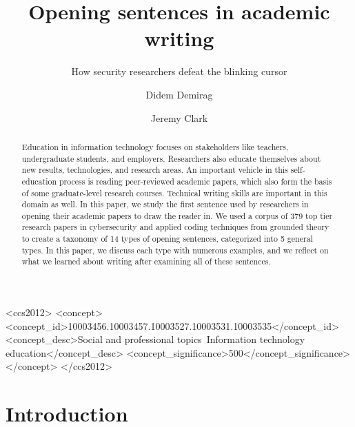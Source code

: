 \documentclass[sigconf,anonymous]{acmart}
\begin{document}
	
\title{Opening sentences in academic writing}
\subtitle{How security researchers defeat the blinking cursor}

\author{Didem Demirag}
\author{Jeremy Clark}
	
\begin{abstract}

Education in information technology focuses on stakeholders like teachers, undergraduate students, and employers. Researchers also educate themselves about new results, technologies, and research areas. An important vehicle in this self-education process is reading peer-reviewed academic papers, which also form the basis of some graduate-level research courses. Technical writing skills are important in this domain as well. In this paper, we study the first sentence used by researchers in opening their academic papers to draw the reader in. We used a corpus of 379 top tier research papers in cybersecurity and applied coding techniques from grounded theory to create a taxonomy of 14 types of opening sentences, categorized into 5 general types. In this paper, we discuss each type with numerous examples, and we reflect on what we learned about writing after examining all of these sentences.

\end{abstract}
	
\begin{CCSXML}
<ccs2012>
   <concept>
       <concept_id>10003456.10003457.10003527.10003531.10003535</concept_id>
       <concept_desc>Social and professional topics~Information technology education</concept_desc>
       <concept_significance>500</concept_significance>
       </concept>
 </ccs2012>
\end{CCSXML}

	
	
\maketitle
	
	
\section{Introduction}
 
\end{document}
